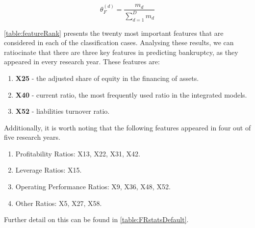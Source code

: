 \begin{equation}
\label{eqn:featureImp}
\theta_{F}^{(d)}=\frac{m_{d}}{\sum_{d=1}^{D} m_{d}}
\end{equation}


\autoref{table:featureRank} presents the twenty most important features that are considered in each of the classification cases. Analysing these results, we can ratiocinate that there are three key features in predicting bankruptcy, as they appeared in every research year. These features are:  
\begin{enumerate}
    \item \textbf{X25} - the adjusted share of equity in the financing of assets.
    \item \textbf{X40} - current ratio, the most frequently used ratio in the integrated models. \cite{zikeba2016ensemble}
    \item \textbf{X52} - liabilities turnover ratio.
\end{enumerate}


Additionally, it is worth noting that the following features appeared in four out of five research years.

\begin{enumerate}
    \item Profitability Ratios: X13, X22, X31, X42.
    \item Leverage Ratios: X15.
    \item Operating Performance Ratios: X9, X36, X48, X52.
    \item Other Ratios: X5, X27, X58.
\end{enumerate}
Further detail on this can be found in \autoref{table:FRstatsDefault}.

